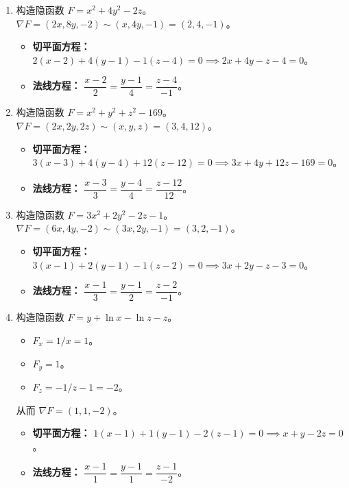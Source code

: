 \documentclass[lang=cn,11pt]{elegantbook}
\begin{document}
\begin{solution}
\begin{enumerate}
    \item[(4)] 构造隐函数 $F = x^2+4y^2-2z$。$\nabla F = (2x, 8y, -2) \sim (x, 4y, -1) = (2, 4, -1)$。
    \begin{itemize}
        \item \textbf{切平面方程：} $2(x-2)+4(y-1)-1(z-4)=0 \implies 2x+4y-z-4=0$。
        \item \textbf{法线方程：} $\dfrac{x-2}{2}=\dfrac{y-1}{4}=\dfrac{z-4}{-1}$。
    \end{itemize}
    
    \item[(5)] 构造隐函数 $F = x^2+y^2+z^2-169$。$\nabla F = (2x, 2y, 2z) \sim (x,y,z) = (3, 4, 12)$。
    \begin{itemize}
        \item \textbf{切平面方程：} $3(x-3)+4(y-4)+12(z-12)=0 \implies 3x+4y+12z-169=0$。
        \item \textbf{法线方程：} $\dfrac{x-3}{3}=\dfrac{y-4}{4}=\dfrac{z-12}{12}$。
    \end{itemize}
    
    \item[(6)] 构造隐函数 $F = 3x^2+2y^2-2z-1$。$\nabla F = (6x, 4y, -2) \sim (3x, 2y, -1) = (3, 2, -1)$。
    \begin{itemize}
        \item \textbf{切平面方程：} $3(x-1)+2(y-1)-1(z-2)=0 \implies 3x+2y-z-3=0$。
        \item \textbf{法线方程：} $\dfrac{x-1}{3}=\dfrac{y-1}{2}=\dfrac{z-2}{-1}$。
    \end{itemize}
    
    \item[(7)] 构造隐函数 $F = y+\ln x - \ln z - z$。
    \begin{itemize}
        \item $F_x = 1/x = 1$。
        \item $F_y = 1$。
        \item $F_z = -1/z - 1 = -2$。
    \end{itemize}
    从而 $\nabla F = (1, 1, -2)$。
    \begin{itemize}
        \item \textbf{切平面方程：} $1(x-1)+1(y-1)-2(z-1)=0 \implies x+y-2z=0$。
        \item \textbf{法线方程：} $\dfrac{x-1}{1}=\dfrac{y-1}{1}=\dfrac{z-1}{-2}$。
    \end{itemize}
    

\end{enumerate}
\end{solution}
\end{document}
